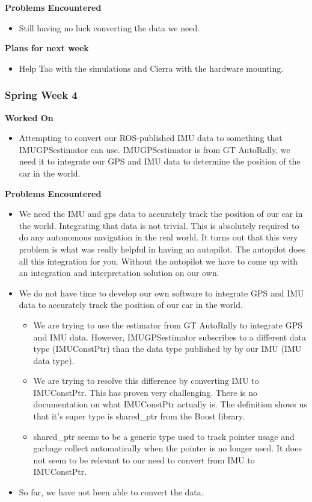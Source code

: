 \documentclass[compsoc,draftclsnofoot,onecolumn,10pt]{IEEEtran}
\begin{document}
\textbf{Problems Encountered}
\begin{itemize}
    \item Still having no luck converting the data we need.
\end{itemize}

\textbf{Plans for next week}
\begin{itemize}
    \item Help Tao with the simulations and Cierra with the hardware mounting.
\end{itemize}


\subsubsection*{Spring Week 4}

\textbf{Worked On}
\begin{itemize}
    \item Attempting to convert our ROS-published IMU data to something that IMUGPSestimator can use. IMUGPSestimator is from GT AutoRally, we need it to integrate our GPS and IMU data to determine the position of the car in the world.
\end{itemize}

\textbf{Problems Encountered}
\begin{itemize}
    \item We need the IMU and gps data to accurately track the position of our car in the world. Integrating that data is not trivial. This is absolutely required to do any autonomous navigation in the real world. It turns out that this very problem is what was really helpful in having an autopilot. The autopilot does all this integration for you. Without the autopilot we have to come up with an integration and interpretation solution on our own.
\item We do not have time to develop our own software to integrate GPS and IMU data to accurately track the position of our car in the world.
\begin{itemize}
    \item We are trying to use the estimator from GT AutoRally to integrate GPS and IMU data. However, IMUGPSestimator subscribes to a different data type (IMUConstPtr) than the data type published by by our IMU (IMU data type).
    \item We are trying to resolve this difference by converting IMU to IMUConstPtr. This has proven very challenging. There is no documentation on what IMUConstPtr actually is. The definition shows us that it's super type is shared\_ptr from the Boost library.
    \item shared\_ptr seems to be a generic type used to track pointer usage and garbage collect automatically when the pointer is no longer used. It does not seem to be relevant to our need to convert from IMU to IMUConstPtr.
\end{itemize}

\item So far, we have not been able to convert the data.
\end{itemize}
\end{document}
